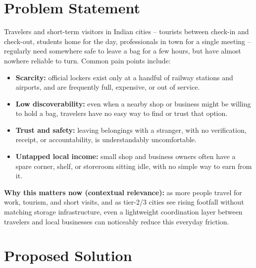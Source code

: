 \documentclass[11pt,a4paper]{article}
\begin{document}
\section{Problem Statement}
Travelers and short-term visitors in Indian cities -- tourists between
check-in and check-out, students home for the day, professionals in town for
a single meeting -- regularly need somewhere safe to leave a bag for a few
hours, but have almost nowhere reliable to turn. Common pain points include:
\begin{itemize}[leftmargin=0.7cm]
    \item \textbf{Scarcity:} official lockers exist only at a handful of railway stations and airports, and are frequently full, expensive, or out of service.
    \item \textbf{Low discoverability:} even when a nearby shop or business might be willing to hold a bag, travelers have no easy way to find or trust that option.
    \item \textbf{Trust and safety:} leaving belongings with a stranger, with no verification, receipt, or accountability, is understandably uncomfortable.
    \item \textbf{Untapped local income:} small shop and business owners often have a spare corner, shelf, or storeroom sitting idle, with no simple way to earn from it.
\end{itemize}

\textbf{Why this matters now (contextual relevance):} as more people travel for
work, tourism, and short visits, and as tier-2/3 cities see rising footfall
without matching storage infrastructure, even a lightweight coordination
layer between travelers and local businesses can noticeably reduce this
everyday friction.

\section{Proposed Solution}
\end{document}
